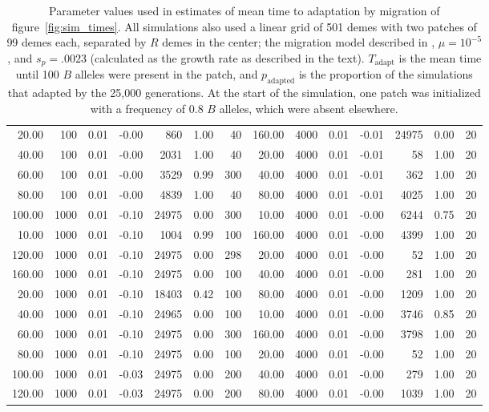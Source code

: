 \begin{table}[ht]
{\begin{tabular}{|rrrrrrr||rrrrrrr|}
  20.00 & 100 & 0.01 & -0.00 & 860 & 1.00 & 40 & 160.00 & 4000 & 0.01 & -0.01 & 24975 & 0.00 & 20 \\ 
  40.00 & 100 & 0.01 & -0.00 & 2031 & 1.00 & 40 & 20.00 & 4000 & 0.01 & -0.01 & 58 & 1.00 & 20 \\ 
  60.00 & 100 & 0.01 & -0.00 & 3529 & 0.99 & 300 & 40.00 & 4000 & 0.01 & -0.01 & 362 & 1.00 & 20 \\ 
  80.00 & 100 & 0.01 & -0.00 & 4839 & 1.00 & 40 & 80.00 & 4000 & 0.01 & -0.01 & 4025 & 1.00 & 20 \\ 
  100.00 & 1000 & 0.01 & -0.10 & 24975 & 0.00 & 300 & 10.00 & 4000 & 0.01 & -0.00 & 6244 & 0.75 & 20 \\ 
  10.00 & 1000 & 0.01 & -0.10 & 1004 & 0.99 & 100 & 160.00 & 4000 & 0.01 & -0.00 & 4399 & 1.00 & 20 \\ 
  120.00 & 1000 & 0.01 & -0.10 & 24975 & 0.00 & 298 & 20.00 & 4000 & 0.01 & -0.00 & 52 & 1.00 & 20 \\ 
  160.00 & 1000 & 0.01 & -0.10 & 24975 & 0.00 & 100 & 40.00 & 4000 & 0.01 & -0.00 & 281 & 1.00 & 20 \\ 
  20.00 & 1000 & 0.01 & -0.10 & 18403 & 0.42 & 100 & 80.00 & 4000 & 0.01 & -0.00 & 1209 & 1.00 & 20 \\ 
  40.00 & 1000 & 0.01 & -0.10 & 24965 & 0.00 & 100 & 10.00 & 4000 & 0.01 & -0.00 & 3746 & 0.85 & 20 \\ 
  60.00 & 1000 & 0.01 & -0.10 & 24975 & 0.00 & 300 & 160.00 & 4000 & 0.01 & -0.00 & 3798 & 1.00 & 20 \\ 
  80.00 & 1000 & 0.01 & -0.10 & 24975 & 0.00 & 100 & 20.00 & 4000 & 0.01 & -0.00 & 52 & 1.00 & 20 \\ 
  100.00 & 1000 & 0.01 & -0.03 & 24975 & 0.00 & 200 & 40.00 & 4000 & 0.01 & -0.00 & 279 & 1.00 & 20 \\ 
  120.00 & 1000 & 0.01 & -0.03 & 24975 & 0.00 & 200 & 80.00 & 4000 & 0.01 & -0.00 & 1039 & 1.00 & 20 \\ 
   \hline
\end{tabular}
}
\caption{
            Parameter values used in estimates of mean time to adaptation by migration of figure~\ref{fig:sim_times}.
            All simulations also used a linear grid of 501 demes with two patches of 99 demes each,
            separated by $R$ demes in the center;
            the migration model described in ,
            $\mu=10^{-5}$, and $s_p=.0023$ (calculated as the growth rate as described in the text).
            $T_\text{adapt}$ is the mean time until 100 $B$ alleles were present in the patch,
            and $p_\text{adapted}$ is the proportion of the simulations that adapted by the 25,000 generations.
            At the start of the simulation, one patch was initialized with a frequency of 0.8 $B$ alleles, which were absent elsewhere.
            } 
\label{stab:migration_params}
\end{table}
